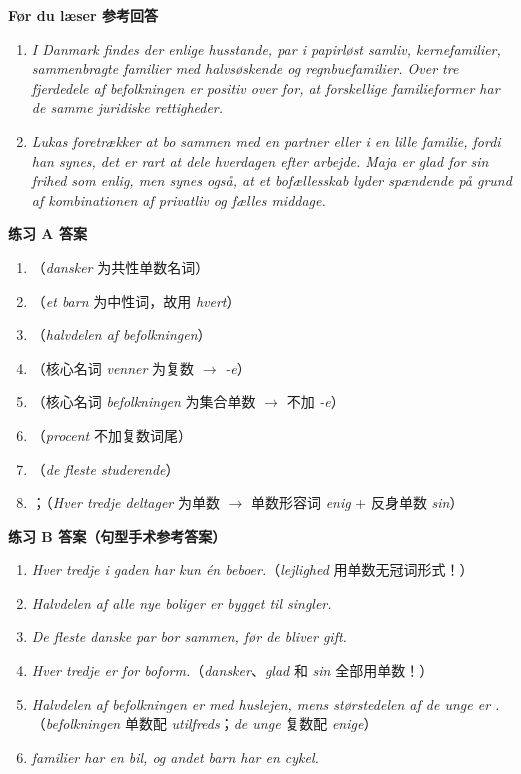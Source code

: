 \begin{answerbox}
\textbf{Før du læser 参考回答}
\begin{enumerate}
  \item \textit{I Danmark findes der enlige husstande, par i papirløst samliv, kernefamilier, sammenbragte familier med halvsøskende og regnbuefamilier. Over tre fjerdedele af befolkningen er positiv over for, at forskellige familieformer har de samme juridiske rettigheder.}
  \item \textit{Lukas foretrækker at bo sammen med en partner eller i en lille familie, fordi han synes, det er rart at dele hverdagen efter arbejde. Maja er glad for sin frihed som enlig, men synes også, at et bofællesskab lyder spændende på grund af kombinationen af privatliv og fælles middage.}
\end{enumerate}

\textbf{练习 A 答案}
\begin{enumerate}
  \item {}（\textit{dansker} 为共性单数名词）
  \item {}（\textit{et barn} 为中性词，故用 \textit{hvert}）
  \item {}（\textit{halvdelen af befolkningen}）
  \item {}（核心名词 \textit{venner} 为复数 $\rightarrow$ \textit{-e}）
  \item {}（核心名词 \textit{befolkningen} 为集合单数 $\rightarrow$ 不加 \textit{-e}）
  \item {}（\textit{procent} 不加复数词尾）
  \item {}（\textit{de fleste studerende}）
  \item {}；（\textit{Hver tredje deltager} 为单数 $\rightarrow$ 单数形容词 \textit{enig} + 反身单数 \textit{sin}）
\end{enumerate}

\textbf{练习 B 答案（句型手术参考答案）}
\begin{enumerate}
  \item \textit{Hver tredje  i gaden har kun én beboer.}（\textit{lejlighed} 用单数无冠词形式！）
  \item \textit{Halvdelen af alle nye boliger er bygget til singler.}
  \item \textit{De fleste danske par bor sammen, før de bliver gift.}
  \item \textit{Hver tredje  er  for  boform.}（\textit{dansker}、\textit{glad} 和 \textit{sin} 全部用单数！）
  \item \textit{Halvdelen af befolkningen er  med huslejen, mens størstedelen af de unge er .}（\textit{befolkningen} 单数配 \textit{utilfreds}；\textit{de unge} 复数配 \textit{enige}）
  \item \textit{ familier har en bil, og  andet barn har en cykel.}
\end{enumerate}


\end{answerbox}
